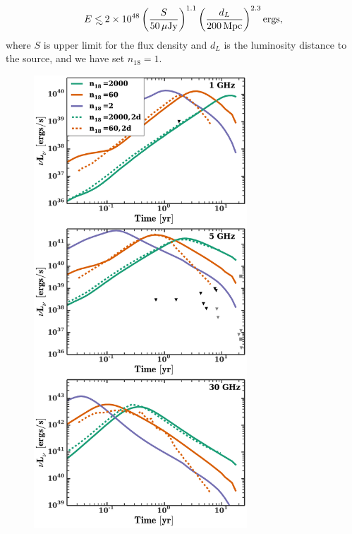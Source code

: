 \documentclass[usenatbib,fleqn]{mnras}
\newcommand\lsim{\mathrel{\rlap{\lower4pt\hbox{\hskip1pt$\sim$}}
    \raise1pt\hbox{$<$}}}
\begin{document}

\begin{equation}
E\lsim 2 \times 10^{48} \left(\frac{S}{50 \,\mu{\rm Jy}}\right)^{1.1}
  \left(\frac{d_L}{200 \,{\rm Mpc}}\right)^{2.3} {\rm ergs},
\end{equation}
%
where $S$ is upper limit for the flux density and $d_L$ is the
luminosity distance to the source, and we have set $n_{18}=1$. 

\begin{figure} 
  \includegraphics[width=8cm]{lightcurves.pdf}

\end{figure}
\end{document}
